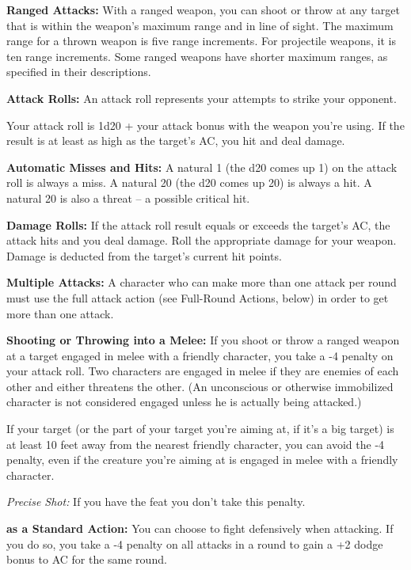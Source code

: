 \textbf{Ranged Attacks:} With a ranged weapon, you can shoot or throw at any target that is within the weapon's maximum range and in line of sight. The maximum range for a thrown weapon is five range increments. For projectile weapons, it is ten range increments. Some ranged weapons have shorter maximum ranges, as specified in their descriptions.

\textbf{Attack Rolls:} An attack roll represents your attempts to strike your opponent. 

Your attack roll is 1d20 + your attack bonus with the weapon you're using. If the result is at least as high as the target's AC, you hit and deal damage.

\textbf{Automatic Misses and Hits:} A natural 1 (the d20 comes up 1) on the attack roll is always a miss. A natural 20 (the d20 comes up 20) is always a hit. A natural 20 is also a threat -- a possible critical hit.

\textbf{Damage Rolls:} If the attack roll result equals or exceeds the target's AC, the attack hits and you deal damage. Roll the appropriate damage for your weapon. Damage is deducted from the target's current hit points.

\textbf{Multiple Attacks:} A character who can make more than one attack per round must use the full attack action (see Full-Round Actions, below) in order to get more than one attack.

\textbf{Shooting or Throwing into a Melee:} If you shoot or throw a ranged weapon at a target engaged in melee with a friendly character, you take a -4 penalty on 
your attack roll. Two characters are engaged in melee if they are enemies of each other and either threatens the other. (An unconscious or otherwise immobilized character is not considered engaged unless he is actually being attacked.)

If your target (or the part of your target you're aiming at, if it's a big target) is at least 10 feet away from the nearest friendly character, you can avoid the -4 penalty, even if the creature you're aiming at is engaged in melee with a friendly character.

\textit{Precise Shot:} If you have the  feat you don't take this penalty.

\textbf{ as a Standard Action:} You can choose to fight defensively when attacking. If you do so, you take a -4 penalty on all attacks in a round to gain a +2 dodge bonus to AC for the same round.

